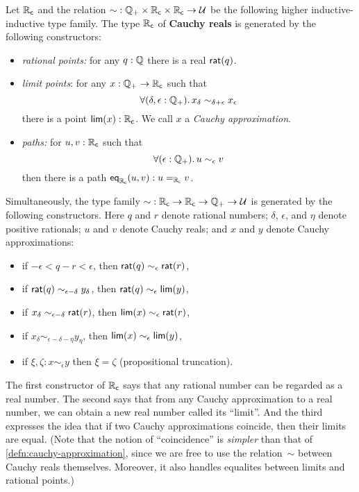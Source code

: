 \begin{defn}\label{defn:cauchy-reals}
  Let $\RC$ and the relation $\mathord\sim:\Qp \times \RC \times \RC \to \type$ be the following higher inductive-inductive type family.
  The type $\RC$ of \textbf{Cauchy reals} is generated by the following constructors:
  \begin{itemize}
  \item \emph{rational points:} 
    for any $q : \Q$ there is a real $\rcrat(q)$.
  \item \emph{limit points}:
    for any $x : \Qp \to \RC$ such that
    \begin{equation}
      \label{eq:RC-cauchy}
      \fall{\delta, \epsilon : \Qp} x_\delta \sim_{\delta + \epsilon} x_\epsilon
    \end{equation}
    there is a point $\rclim(x) : \RC$. We call $x$ a \emph{Cauchy approximation}.
  \item \emph{paths:}
    for $u, v : \RC$ such that
    \begin{equation}
      \label{eq:RC-path}
      \fall{\epsilon : \Qp} u \sim_\epsilon v
    \end{equation}
    then there is a path $\rceq(u, v) : \id[\RC]{u}{v}$.
  \end{itemize}
  Simultaneously, the type family $\mathord\sim:\RC\to\RC\to\Qp \to\type$ is generated by the following constructors.
  Here $q$ and $r$ denote rational numbers; $\delta$, $\epsilon$, and $\eta$ denote positive rationals; $u$ and $v$ denote Cauchy reals; and $x$ and $y$ denote Cauchy approximations:
  \begin{itemize}
  \item if $-\epsilon < q - r < \epsilon$, then $\rcrat(q) \sim_\epsilon \rcrat(r)$,
  \item if $\rcrat(q) \sim_{\epsilon - \delta} y_\delta$, then $\rcrat(q) \sim_{\epsilon} \rclim(y)$,
  \item if $x_\delta \sim_{\epsilon - \delta} \rcrat(r)$, then $\rclim(x) \sim_\epsilon \rcrat(r)$,
  \item if $x_\delta \sim_{\epsilon - \delta - \eta} y_\eta$, then $\rclim(x) \sim_\epsilon \rclim(y)$,
  \item if $\xi,\zeta : x \sim_{\epsilon} y$ then $\xi=\zeta$ (propositional truncation).
  \end{itemize}
\end{defn}

\medskip

The first constructor of $\RC$ says that any rational number can be regarded as a real number.
The second says that from any Cauchy approximation to a real number, we can obtain a new real number called its ``limit''.
And the third expresses the idea that if two Cauchy approximations coincide, then their limits are equal.
(Note that the notion of ``coincidence'' is \emph{simpler} than that of \autoref{defn:cauchy-approximation}, since we are free to use the relation~$\sim$ between Cauchy reals themselves.
Moreover, it also handles equalites between limits and rational points.)

